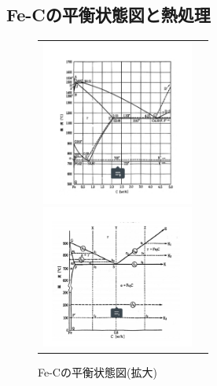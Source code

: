 \documentclass[a4paper,11pt,uplatex]{jsarticle}
\begin{document}
\subsection{Fe-Cの平衡状態図と熱処理}
\begin{figure}[H]
  \begin{tabular}{cc}
    \begin{minipage}{0.5\hsize}
      \begin{center}
        \includegraphics[width = 5cm]{画像/FeC平衡図.png}
        \caption{Fe-Cの平衡状態図}
        \label{FeC平衡図}
      \end{center}
    \end{minipage}

    \begin{minipage}{0.5\hsize}
      \begin{center}
        \includegraphics[width = 5cm]{画像/FeC平衡図拡大.png}
        \caption{Fe-Cの平衡状態図(拡大)}
        \label{FeC平衡図拡大}
      \end{center}
    \end{minipage}
  \end{tabular}
\end{figure}
\end{document}
